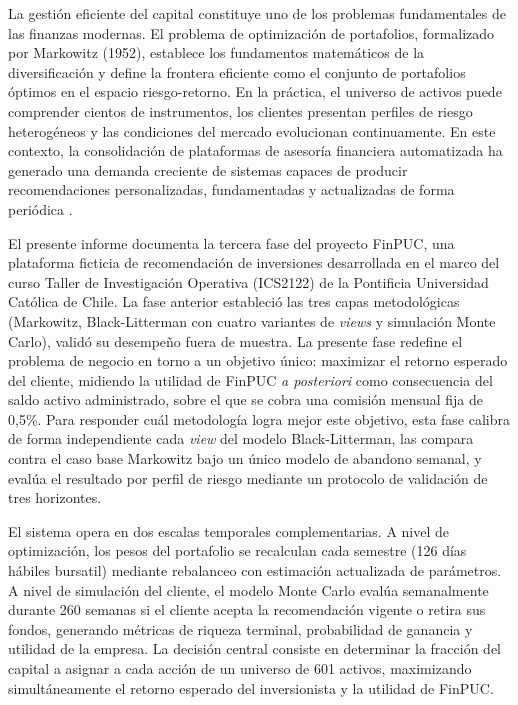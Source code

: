 La gesti\'on eficiente del capital constituye uno de los problemas
fundamentales de las finanzas modernas. El problema de optimizaci\'on de
portafolios, formalizado por Markowitz (1952), establece los fundamentos
matem\'aticos de la diversificaci\'on y define la frontera eficiente como el
conjunto de portafolios \'optimos en el espacio riesgo-retorno. En la
pr\'actica, el universo de activos puede comprender cientos de instrumentos,
los clientes presentan perfiles de riesgo heterog\'eneos y las condiciones del
mercado evolucionan continuamente. En este contexto, la consolidaci\'on de
plataformas de asesor\'ia financiera automatizada ha generado una demanda
creciente de sistemas capaces de producir recomendaciones personalizadas,
fundamentadas y actualizadas de forma peri\'odica \cite{dacunto2019}.

El presente informe documenta la tercera fase del proyecto FinPUC, una
plataforma ficticia de recomendaci\'on de inversiones desarrollada en el marco
del curso Taller de Investigaci\'on Operativa (ICS2122) de la Pontificia
Universidad Cat\'olica de Chile. La fase anterior estableci\'o las tres capas
metodol\'ogicas (Markowitz, Black-Litterman con cuatro variantes de
\textit{views} y simulaci\'on Monte Carlo), valid\'o su desempe\~no fuera de
muestra. La presente fase redefine el problema de negocio en torno a un objetivo
\'unico: maximizar el retorno esperado del cliente, midiendo la utilidad de
FinPUC \emph{a posteriori} como consecuencia del saldo activo administrado, sobre
el que se cobra una comisi\'on mensual fija de 0,5\%. Para responder cu\'al
metodolog\'ia logra mejor este objetivo, esta fase calibra de forma independiente
cada \textit{view} del modelo Black-Litterman, las compara contra el caso base
Markowitz bajo un \'unico modelo de abandono semanal, y eval\'ua el resultado por
perfil de riesgo mediante un protocolo de validaci\'on de tres horizontes.

El sistema opera en dos escalas temporales complementarias. A nivel de
optimizaci\'on, los pesos del portafolio se recalculan cada semestre (126
d\'ias h\'abiles bursatil) mediante rebalanceo con estimaci\'on actualizada de
par\'ametros. A nivel de simulaci\'on del cliente, el modelo Monte Carlo
eval\'ua semanalmente durante 260 semanas si el cliente acepta la
recomendaci\'on vigente o retira sus fondos, generando m\'etricas de riqueza
terminal, probabilidad de ganancia y utilidad de la empresa. La decisi\'on
central consiste en determinar la fracci\'on del capital a asignar a cada
acci\'on de un universo de 601 activos, maximizando simult\'aneamente el
retorno esperado del inversionista y la utilidad de FinPUC.